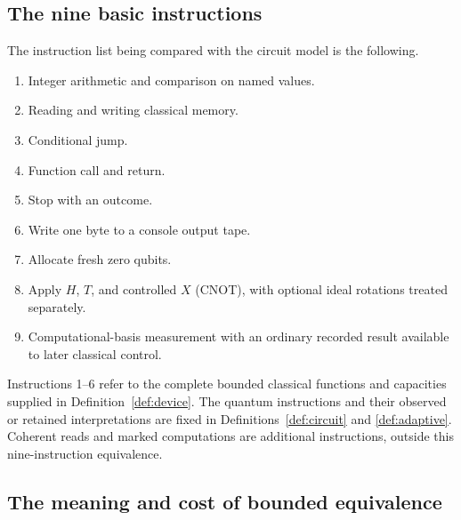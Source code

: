 \subsection{The nine basic instructions}
The instruction list being compared with the circuit model is the following.
\begin{enumerate}
\item Integer arithmetic and comparison on named values.
\item Reading and writing classical memory.
\item Conditional jump.
\item Function call and return.
\item Stop with an outcome.
\item Write one byte to a console output tape.
\item Allocate fresh zero qubits.
\item Apply $H$, $T$, and controlled $X$ (CNOT), with optional ideal rotations treated separately.
\item Computational-basis measurement with an ordinary recorded result available to later classical control.
\end{enumerate}
Instructions 1--6 refer to the complete bounded classical functions and capacities supplied in Definition~\ref{def:device}. The quantum instructions and their observed or retained interpretations are fixed in Definitions~\ref{def:circuit} and \ref{def:adaptive}. Coherent reads and marked computations are additional instructions, outside this nine-instruction equivalence.

\subsection{The meaning and cost of bounded equivalence}

